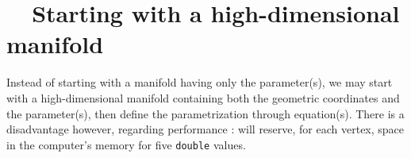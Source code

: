 \section{~~Starting with a high-dimensional manifold}\label{\numb section 2.\numb parag 21}

Instead of starting with a manifold having only the parameter(s), we may start with a
high-dimensional manifold containing both the geometric coordinates and the parameter(s),
then define the parametrization through equation(s).
There is a disadvantage however, regarding performance : {\maniFEM} will reserve,
for each vertex, space in the computer's memory for five {\small\tt double} values.

